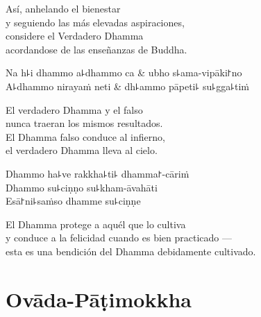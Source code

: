 \begin{english}
  Así, anhelando el bienestar\\
  y seguiendo las más elevadas aspiraciones,\\
  considere el Verdadero Dhamma\\
  acordandose de las enseñanzas de Buddha.
\end{english}

\clearpage

\begin{twochants}
  Na h꜕i dhammo a꜕dhammo ca & ubho s꜕ama-vipāki꜓no \\
  A꜕dhammo nirayaṁ neti & dh꜕ammo pāpeti꜕ su꜕gga꜕tiṁ \\
\end{twochants}

\begin{english}
  El verdadero Dhamma y el falso\\
  nunca traeran los mismos resultados.\\
  El Dhamma falso conduce al infierno,\\
  el verdadero Dhamma lleva al cielo.
\end{english}

Dhammo ha꜕ve rakkha꜕ti꜕ dhamma꜓-cāriṁ\\
Dhammo su꜕ciṇṇo su꜕kham-āvahāti\\
Esā꜓ni꜕saṁso dhamme su꜕ciṇṇe


\begin{english}
  El Dhamma protege a aquél que lo cultiva\\
  y conduce a la felicidad cuando es bien practicado ---\\
  esta es una bendición del Dhamma debidamente cultivado.
\end{english}

\chapter{Ovāda-Pāṭimokkha}


\enlargethispage{\baselineskip}

\begin{leader}
\end{leader}

